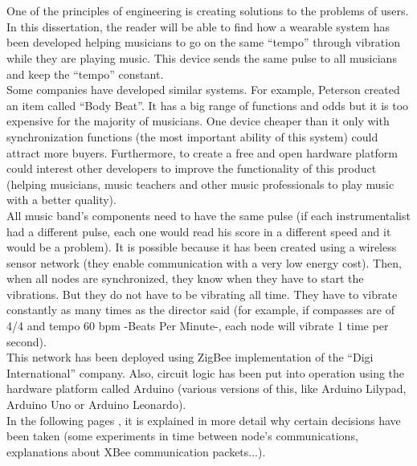 \\

\vspace{0.7cm}
\\

One of the principles of engineering is creating solutions to the problems of users.
In this dissertation, the reader will be able to find how a wearable system has been developed
helping musicians to go on the same “tempo” through vibration while they are playing music.
This device sends the same pulse to all musicians and keep the “tempo” constant.\\

Some companies have developed similar systems. For example, Peterson created an item called “Body Beat”.
It has a big range of functions and odds but it is too expensive for the majority of musicians. One device
cheaper than it only with synchronization functions (the most important ability of this system) could attract
more buyers. Furthermore, to create a free and open hardware platform could interest other developers to improve
the functionality of this product (helping musicians, music teachers and other music professionals to play music
with a better quality).\\

All music band’s components need to have the same pulse (if each instrumentalist had a different pulse, each
one would read his score in a different speed and it would be a problem). It is possible because it has been
created using a wireless sensor network (they enable communication with a very low energy cost). Then, when all
nodes are synchronized, they know when they have to start the vibrations. But they do not have to be vibrating all
time. They have to vibrate constantly as many times as the director said (for example, if compasses are of 4/4 and
tempo 60 bpm -Beats Per Minute-, each node will vibrate 1 time per second).\\

This network has been deployed using ZigBee implementation of the “Digi International” company. Also, circuit logic
has been put into operation using the hardware platform called Arduino (various versions of this, like Arduino Lilypad,
Arduino Uno or Arduino Leonardo).\\

In the following pages , it is explained in more detail why certain decisions have been taken (some experiments in
time between node's communications, explanations about XBee communication packets...).\\


